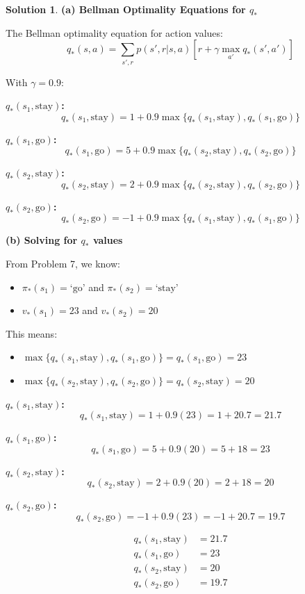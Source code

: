 \documentclass[11pt]{article}
\theoremstyle{definition}
\newtheorem*{solution}{Solution}
\begin{document}
\begin{solution}
\textbf{(a) Bellman Optimality Equations for $q_*$}

The Bellman optimality equation for action values:
\[
q_*(s,a) = \sum_{s',r} p(s',r|s,a) \left[ r + \gamma \max_{a'} q_*(s', a') \right]
\]

With $\gamma = 0.9$:

\textbf{$q_*(s_1, \text{stay})$:}
\[
q_*(s_1, \text{stay}) = 1 + 0.9 \max\{q_*(s_1, \text{stay}), q_*(s_1, \text{go})\}
\]

\textbf{$q_*(s_1, \text{go})$:}
\[
q_*(s_1, \text{go}) = 5 + 0.9 \max\{q_*(s_2, \text{stay}), q_*(s_2, \text{go})\}
\]

\textbf{$q_*(s_2, \text{stay})$:}
\[
q_*(s_2, \text{stay}) = 2 + 0.9 \max\{q_*(s_2, \text{stay}), q_*(s_2, \text{go})\}
\]

\textbf{$q_*(s_2, \text{go})$:}
\[
q_*(s_2, \text{go}) = -1 + 0.9 \max\{q_*(s_1, \text{stay}), q_*(s_1, \text{go})\}
\]

\textbf{(b) Solving for $q_*$ values}

From Problem 7, we know:
\begin{itemize}
    \item $\pi_*(s_1) = \text{`go'}$ and $\pi_*(s_2) = \text{`stay'}$
    \item $v_*(s_1) = 23$ and $v_*(s_2) = 20$
\end{itemize}

This means:
\begin{itemize}
    \item $\max\{q_*(s_1, \text{stay}), q_*(s_1, \text{go})\} = q_*(s_1, \text{go}) = 23$
    \item $\max\{q_*(s_2, \text{stay}), q_*(s_2, \text{go})\} = q_*(s_2, \text{stay}) = 20$
\end{itemize}

\textbf{$q_*(s_1, \text{stay})$:}
\[
q_*(s_1, \text{stay}) = 1 + 0.9(23) = 1 + 20.7 = 21.7
\]

\textbf{$q_*(s_1, \text{go})$:}
\[
q_*(s_1, \text{go}) = 5 + 0.9(20) = 5 + 18 = 23
\]

\textbf{$q_*(s_2, \text{stay})$:}
\[
q_*(s_2, \text{stay}) = 2 + 0.9(20) = 2 + 18 = 20
\]

\textbf{$q_*(s_2, \text{go})$:}
\[
q_*(s_2, \text{go}) = -1 + 0.9(23) = -1 + 20.7 = 19.7
\]

\[
\boxed{
\begin{aligned}
q_*(s_1, \text{stay}) &= 21.7 \\
q_*(s_1, \text{go}) &= 23 \\
q_*(s_2, \text{stay}) &= 20 \\
q_*(s_2, \text{go}) &= 19.7
\end{aligned}
}
\]


\end{solution}
\end{document}
